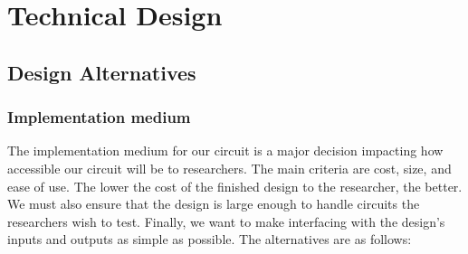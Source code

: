\section{Technical Design}

\subsection{Design Alternatives}

% 
% 
% 

\subsubsection{Implementation medium}

The implementation medium for our circuit is a major decision impacting how accessible our circuit will be to researchers.
The main criteria are cost, size, and ease of use.
The lower the cost of the finished design to the researcher, the better.
We must also ensure that the design is large enough to handle circuits the researchers wish to test.
Finally, we want to make interfacing with the design's inputs and outputs as simple as possible.
The alternatives are as follows:

